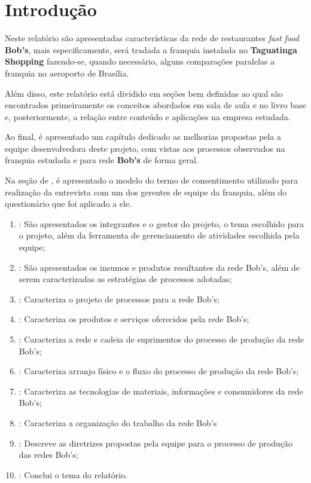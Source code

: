 \chapter[Introdução]{Introdução}
\label{chap:introducao}
	
	Neste relatório são apresentadas características da rede de restaurantes \emph{fast food} \textbf{Bob's}, mais especificamente, será tradada a franquia instalada no \textbf{Taguatinga Shopping} fazendo-se, quando necessário, alguns comparações paralelas a franquia no aeroporto de Brasília.

	Além disso, este relatório está dividido em seções bem definidas ao qual são encontrados primeiramente os conceitos abordados em sala de aula e no livro base \cite{slack} e, posteriormente, a relação entre conteúdo e aplicações na empresa estudada.

	Ao final, é apresentado um capítulo dedicado as melhorias propostas pela a equipe desenvolvedora deste projeto, com vistas aos processos observados na franquia estudada e para rede \textbf{Bob's} de forma geral.

	Na seção de , é apresentado o modelo do termo de consentimento utilizado para realização da entrevista com um dos gerentes de equipe da franquia, além do questionário que foi aplicado a ele.

	\begin{enumerate}
		\item{\textbf{}: São apresentados os integrantes e o gestor do projeto, o tema escolhido para o projeto, além da ferramenta de gerenciamento de atividades escolhida pela equipe;}
		\item{\textbf{}: São apresentados os insumos e produtos resultantes da rede Bob's, além de serem caracterizadas as estratégias de processos adotadas;}
		\item{\textbf{}: Caracteriza o projeto de processos para a rede Bob's;}
		\item{\textbf{}: Caracteriza os produtos e serviços oferecidos pela rede Bob's;}
		\item{\textbf{}: Caracteriza a rede e cadeia de suprimentos do processo de produção da rede Bob's;}
		\item{\textbf{}: Caracteriza arranjo físico e o fluxo do processo de produção da rede Bob's;}
		\item{\textbf{}: Caracteriza as tecnologias de materiais, informações e consumidores da rede Bob's;}
		\item{\textbf{}: Caracteriza a organização do trabalho da rede Bob's}
		\item{\textbf{}: Descreve as diretrizes propostas pela equipe para o processo de produção das redes Bob's;}
		\item{\textbf{}: Conclui o tema do relatório.}
	\end{enumerate}
